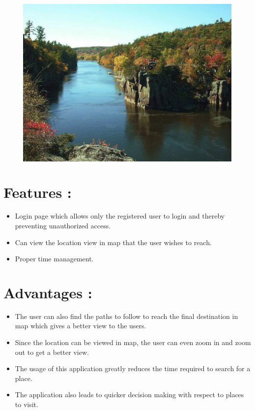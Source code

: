 \documentclass[12pt]{IEEEtran}
\begin{document}
\begin{figure}
\centering
\includegraphics[width=1\linewidth]{111.pdf}
\label{fig:block-diagram}
\end{figure}

\section{Features :}
   \begin{itemize}
   \item Login page which allows only the registered user to login and thereby preventing unauthorized access.
   \item Can view the location view in map that the user wishes to reach.
   \item Proper time management.
   \end{itemize} \hfill \break

\section{Advantages :}
  \begin{itemize}
  \item The user can also find the paths to follow to reach the final destination in map which gives a better view to the users.
  \item Since the location can be viewed in map, the user can even zoom in and zoom out to get a better view.
  \item The usage of this application greatly reduces the time required to search for a place.
  \item The application also leads to quicker decision making with respect to places to visit.
  \end{itemize} \hfill \break
\end{document}
